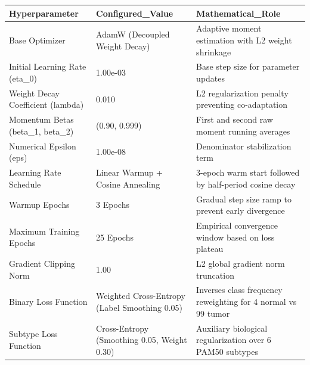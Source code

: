 \begin{tabular}{lll}
\toprule
Hyperparameter & Configured_Value & Mathematical_Role \\
\midrule
Base Optimizer & AdamW (Decoupled Weight Decay) & Adaptive moment estimation with L2 weight shrinkage \\
Initial Learning Rate (eta_0) & 1.00e-03 & Base step size for parameter updates \\
Weight Decay Coefficient (lambda) & 0.010 & L2 regularization penalty preventing co-adaptation \\
Momentum Betas (beta_1, beta_2) & (0.90, 0.999) & First and second raw moment running averages \\
Numerical Epsilon (eps) & 1.00e-08 & Denominator stabilization term \\
Learning Rate Schedule & Linear Warmup + Cosine Annealing & 3-epoch warm start followed by half-period cosine decay \\
Warmup Epochs & 3 Epochs & Gradual step size ramp to prevent early divergence \\
Maximum Training Epochs & 25 Epochs & Empirical convergence window based on loss plateau \\
Gradient Clipping Norm & 1.00 & L2 global gradient norm truncation \\
Binary Loss Function & Weighted Cross-Entropy (Label Smoothing 0.05) & Inverses class frequency reweighting for 4 normal vs 99 tumor \\
Subtype Loss Function & Cross-Entropy (Smoothing 0.05, Weight 0.30) & Auxiliary biological regularization over 6 PAM50 subtypes \\
\bottomrule
\end{tabular}
